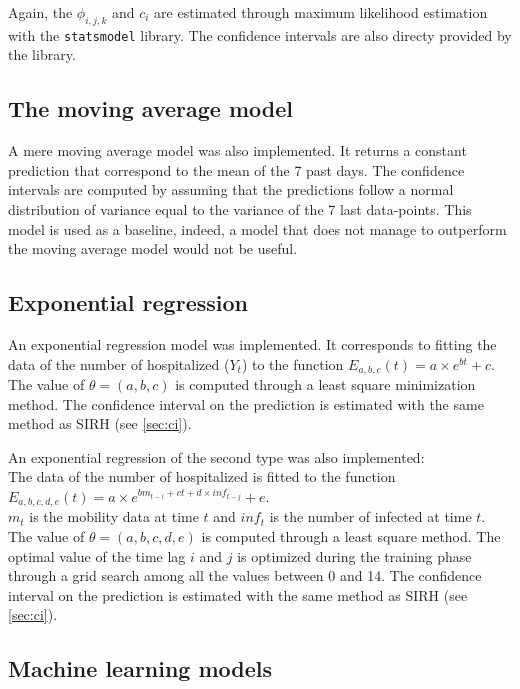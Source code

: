 Again, the $\phi_{i,j,k}$ and  $c_i$ are estimated through maximum likelihood estimation with the \texttt{statsmodel} library. 
The confidence intervals are also directy provided by the library.



\subsection{The moving average model}
\label{sec:moving_average}

A mere moving average model was also implemented. 
It returns a constant prediction that correspond to the mean of the 7 past days. 
The confidence intervals are computed by assuming that the predictions follow a normal distribution of variance equal to the variance of the 7 last data-points.
This model is used as a baseline, indeed, a model that does not manage to outperform the moving average model would not be useful. 

\subsection{Exponential regression}

An exponential regression model was implemented.
It corresponds to fitting the data of the number of hospitalized ($Y_t$) to the function $E_{a, b, c}(t) = a \times e^{b t} +c$.
The value of $\theta = (a, b, c)$ is computed through a least square minimization method.
The confidence interval on the prediction is estimated with the same method as SIRH (see \ref{sec:ci}). 

An exponential regression of the second type was also implemented: \\
The data of the number of hospitalized is fitted to the function $E_{a, b, c, d, e}(t) = a \times e^{b m_{t-i} + c  t + d \times inf_{t-j} }+e$.\\
$m_t$ is the mobility data at time $t$ and $inf_t$ is the number of infected at time $t$.
The value of $\theta = (a, b, c, d, e)$ is computed through a least square method.
The optimal value of the time lag $i$ and $j$ is optimized during the training phase through a grid search among all the values between 0 and 14. 
The confidence interval on the prediction is estimated with the same method as SIRH (see \ref{sec:ci}). 

\subsection{Machine learning models}
\label{sec:mlmodels}

